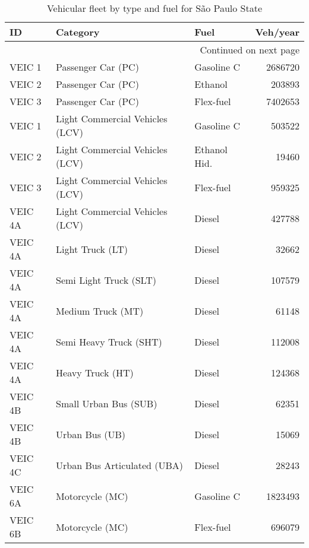 {\footnotesize
\begin{longtable}{lllr}
\caption{Vehicular fleet by type and fuel for São Paulo State \citep{CETESB2019a}}\label{tab:flota}\\
\toprule
	\textbf{ID} &    \textbf{ Category} & \textbf{Fuel} & \textbf{Veh/year} \\
\midrule
\endhead
\midrule
\multicolumn{4}{r}{{Continued on next page}} \\
\midrule
\endfoot

\bottomrule
\endlastfoot
  VEIC 1 &               Passenger Car (PC) &    Gasoline C &   2686720 \\
  VEIC 2 &               Passenger Car (PC) &       Ethanol &    203893 \\
  VEIC 3 &               Passenger Car (PC) &     Flex-fuel &   7402653 \\
  VEIC 1 &  Light Commercial Vehicles (LCV) &    Gasoline C &    503522 \\
  VEIC 2 &  Light Commercial Vehicles (LCV) &  Ethanol Hid. &     19460 \\
  VEIC 3 &  Light Commercial Vehicles (LCV) &     Flex-fuel &    959325 \\
 VEIC 4A &  Light Commercial Vehicles (LCV) &        Diesel &    427788 \\
 VEIC 4A &                 Light Truck (LT) &        Diesel &     32662 \\
 VEIC 4A &           Semi Light Truck (SLT) &        Diesel &    107579 \\
 VEIC 4A &                Medium Truck (MT) &        Diesel &     61148 \\
 VEIC 4A &           Semi Heavy Truck (SHT) &        Diesel &    112008 \\
 VEIC 4A &                 Heavy Truck (HT) &        Diesel &    124368 \\
 VEIC 4B &            Small Urban Bus (SUB) &        Diesel &     62351 \\
 VEIC 4B &                   Urban Bus (UB) &        Diesel &     15069 \\
 VEIC 4C &      Urban Bus Articulated (UBA) &        Diesel &     28243 \\
 VEIC 6A &                  Motorcycle (MC) &    Gasoline C &   1823493 \\
 VEIC 6B &                  Motorcycle (MC) &     Flex-fuel &    696079 \\
\end{longtable}}